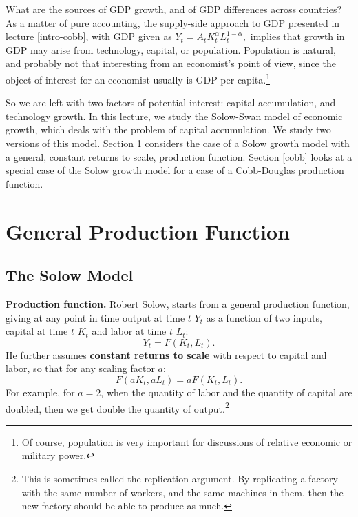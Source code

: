 \documentclass[]{book}
\let\rmarkdownfootnote\footnote%
\def\footnote{\protect\rmarkdownfootnote}
\begin{document}
What are the sources of GDP growth, and of GDP differences across
countries? As a matter of pure accounting, the supply-side approach to
GDP presented in lecture \ref{intro-cobb}, with GDP given as
\(Y_t = A_t K_t^{\alpha} L_t^{1-\alpha},\) implies that growth in GDP
may arise from technology, capital, or population. Population is
natural, and probably not that interesting from an economist's point of
view, since the object of interest for an economist usually is GDP per
capita.\footnote{Of course, population is very important for discussions
  of relative economic or military power.}

So we are left with two factors of potential interest: capital
accumulation, and technology growth. In this lecture, we study the
Solow-Swan model of economic growth, which deals with the problem of
capital accumulation. We study two versions of this model. Section
\ref{general-production-f} considers the case of a Solow growth model
with a general, constant returns to scale, production function. Section
\ref{cobb} looks at a special case of the Solow growth model for a case
of a Cobb-Douglas production function.

\section{General Production Function}\label{general-production-f}

\subsection{The Solow Model}\label{the-solow-model}

\textbf{Production function.}
\href{https://en.wikipedia.org/wiki/Robert_Solow}{Robert Solow}, starts
from a general production function, giving at any point in time output
at time \(t\) \(Y_t\) as a function of two inputs, capital at time \(t\)
\(K_t\) and labor at time \(t\) \(L_t\): \[Y_t=F\left(K_t,L_t\right).\]
He further assumes \textbf{constant returns to scale} with respect to
capital and labor, so that for any scaling factor \(a\):
\[F(aK_t, aL_t) = aF(K_t, L_t).\] For example, for \(a=2\), when the
quantity of labor and the quantity of capital are doubled, then we get
double the quantity of output.\footnote{This is sometimes called the
  replication argument. By replicating a factory with the same number of
  workers, and the same machines in them, then the new factory should be
  able to produce as much.}
\end{document}
